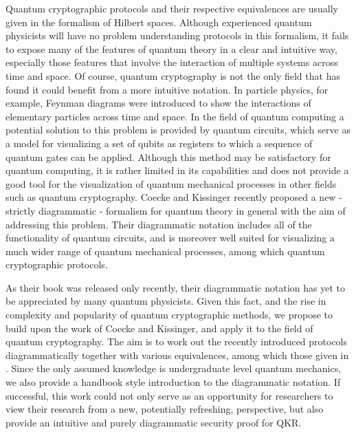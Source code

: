 \documentclass[]{article}
\begin{document}
Quantum cryptographic protocols and their respective equivalences are usually given in the formalism of Hilbert spaces. Although experienced quantum physicists will have no problem understanding protocols in this formalism, it fails to expose many of the features of quantum theory in a clear and intuitive way, especially those features that involve the interaction of multiple systems across time and space. Of course, quantum cryptography is not the only field that has found it could benefit from a more intuitive notation. In particle physics, for example, Feynman diagrams were introduced to show the interactions of elementary particles across time and space. In the field of quantum computing a potential solution to this problem is provided by quantum circuits, which serve as a model for visualizing a set of qubits as registers to which a sequence of quantum gates can be applied. Although this method may be satisfactory for quantum computing, it is rather limited in its capabilities and does not provide a good tool for the visualization of quantum mechanical processes in other fields such as quantum cryptography. Coecke and Kissinger recently proposed \cite{Coecke2017} a new - strictly diagrammatic - formalism for quantum theory in general with the aim of addressing this problem. Their diagrammatic notation includes all of the functionality of quantum circuits, and is moreover well suited for visualizing a much wider range of quantum mechanical processes, among which quantum cryptographic protocols.

As their book was released only recently, their diagrammatic notation has yet to be appreciated by many quantum physicists. Given this fact, and the rise in complexity and popularity of quantum cryptographic methods, we propose to build upon the work of Coecke and Kissinger, and apply it to the field of quantum cryptography. The aim is to work out the recently introduced protocols diagrammatically together with various equivalences, among which those given in \cite{cryptoeprint:2019:875}. Since the only assumed knowledge is undergraduate level quantum mechanics, we also provide a handbook style introduction to the diagrammatic notation. If successful, this work could not only serve as an opportunity for researchers to view their research from a new, potentially refreshing, perspective, but also provide an intuitive and purely diagrammatic security proof for QKR.
\end{document}

